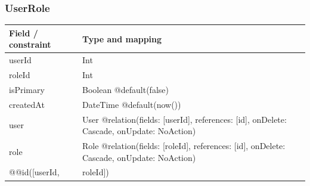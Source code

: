 \subsubsection{UserRole}
\begin{longtable}{|L{3.3cm}|L{10.8cm}|}\hline
Field / constraint & Type and mapping \\ \hline
userId & Int \\ \hline
roleId & Int \\ \hline
isPrimary & Boolean @default(false) \\ \hline
createdAt & DateTime @default(now()) \\ \hline
user & User @relation(fields: [userId], references: [id], onDelete: Cascade, onUpdate: NoAction) \\ \hline
role & Role @relation(fields: [roleId], references: [id], onDelete: Cascade, onUpdate: NoAction) \\ \hline
@@id([userId, & roleId]) \\ \hline
\end{longtable}
